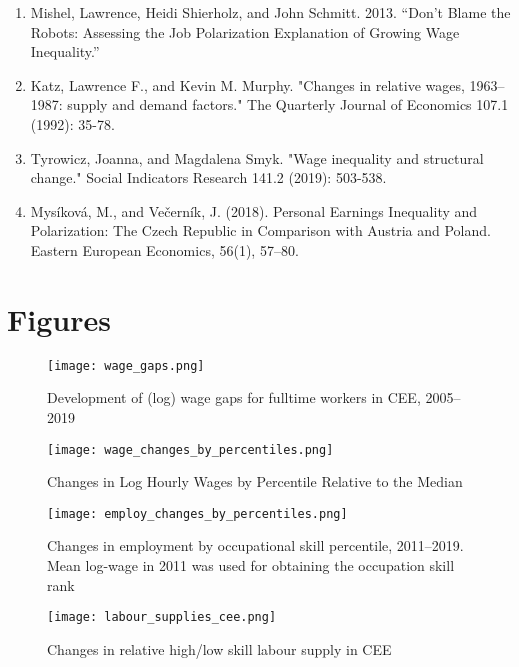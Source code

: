 \documentclass{article}
\begin{document}
\begin{enumerate}
\item Mishel, Lawrence, Heidi Shierholz, and John Schmitt. 2013. “Don’t Blame the Robots: Assessing the Job Polarization Explanation of Growing Wage Inequality.”

\item Katz, Lawrence F., and Kevin M. Murphy. "Changes in relative wages, 1963–1987: supply and demand factors." The Quarterly Journal of Economics 107.1 (1992): 35-78.

\item Tyrowicz, Joanna, and Magdalena Smyk. "Wage inequality and structural change." Social Indicators Research 141.2 (2019): 503-538.

\item Mysíková, M., and Večerník, J. (2018). Personal Earnings Inequality and Polarization: The Czech Republic in Comparison with Austria and Poland. Eastern European Economics, 56(1), 57–80.

\end{enumerate}

\newpage
\section{Figures}

\begin{figure}[h]%
    \centering
    {\texttt{[image: wage\_gaps.png]} }
    \caption{Development of (log) wage gaps for fulltime workers in CEE, 2005–2019}
    \label{wage_gaps_CEE}
\end{figure}

\begin{figure}%
    \centering
    {\texttt{[image: wage\_changes\_by\_percentiles.png]} }
    \caption{Changes in Log Hourly Wages by Percentile Relative to the Median}
    \label{wage_changes_percentiles}
\end{figure}

\begin{figure}%
    \centering
    {\texttt{[image: employ\_changes\_by\_percentiles.png]} }
    \caption{Changes in employment by occupational skill percentile, 2011–2019. Mean log-wage in 2011 was used for obtaining the occupation skill rank}
    \label{employ_changes_percentiles}
\end{figure}

\begin{figure}%
        \centering 
        {\texttt{[image: labour\_supplies\_cee.png]}}
        \caption{Changes in relative high/low skill labour supply in CEE}
        \label{labour_supplies_cee}
\end{figure}
\end{document}
